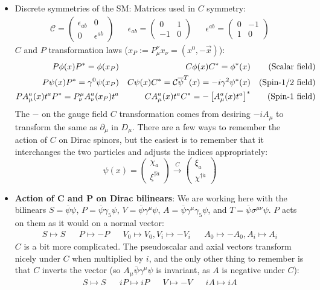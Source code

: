 \documentclass[11pt, oneside]{article}   	%
\theoremstyle{definition}
\numberwithin{equation}{subsection}		%
\begin{document}
\begin{itemize}
	\item Discrete symmetries of the SM: Matrices used in $C$ symmetry:
	\begin{align}
		\mathcal C = \begin{pmatrix} \epsilon_{ab} & 0 \\ 0 & \epsilon^{ab} \end{pmatrix} && \epsilon_{ab} = \begin{pmatrix} 0 & 1 \\ -1 & 0 \end{pmatrix} && \epsilon^{ab} = \begin{pmatrix} 0 & -1 \\ 1 & 0 \end{pmatrix}
	\end{align}
	$C$ and $P$ transformation laws ($x_P := P_\mu^\nu x_\nu = (x^0, -\vec x)$):
	\begin{align}
		P \phi(x) P^* = \phi(x_P) && C \phi(x) C^* = \phi^*(x) && (\textnormal{Scalar field}) \\
		P \psi(x) P^* = \gamma^0 \psi(x_P) && C \psi(x) C^* = \mathcal C\overline{\psi}^T(x) = -i\gamma^2\psi^*(x) && (\textnormal{Spin-1/2 field}) \\
		P A_\mu^a(x) t^a P^* = P^\mu_\nu A_\nu^a(x_P) t^a && C A_\mu^a(x) t^a C^* = - \left[A_\mu^a(x) t^a\right]^* && (\textnormal{Spin-1 field})
	\end{align}
	The $-$ on the gauge field $C$ transformation comes from desiring $-i A_\mu$ to transform the same as $\partial_\mu$ in $D_\mu$. There are a few 
	ways to remember the action of $C$ on Dirac spinors, but the easiest is to remember that it interchanges the two particles and adjusts the 
	indices appropriately:
	\begin{equation}
		\psi(x) = \begin{pmatrix} \chi_a \\ \xi^{\dagger\dot a} \end{pmatrix}\xrightarrow{C} \begin{pmatrix} \xi_a \\ \chi^{\dagger\dot a}\end{pmatrix}
	\end{equation}
	
	\item \textbf{Action of C and P on Dirac bilinears}: We are working here with the bilinears $S = \overline\psi\psi$, $P = \overline\psi\gamma_5\psi$, 
	$V = \overline\psi\gamma^\mu\psi$, $A = \overline\psi\gamma^\mu\gamma_5\psi$, and $T = \overline\psi\sigma^{\mu\nu}\psi$. $P$ acts on them as it 
	would on a normal vector:
	\begin{align}
		S\mapsto S && P\mapsto -P && V_0\mapsto V_0, V_i\mapsto -V_i && A_0\mapsto -A_0, A_i\mapsto A_i
	\end{align}
	$C$ is a bit more complicated. The pseudoscalar and axial vectors transform nicely under $C$ when multiplied by $i$, and the only other thing to remember 
	is that $C$ inverts the vector (so $A_\mu \overline\psi\gamma^\mu\psi$ is invariant, as $A$ is negative under $C$):
	\begin{align}
		S\mapsto S && iP\mapsto iP && V\mapsto -V && iA\mapsto iA
	\end{align}
	

\end{itemize}
\end{document}
